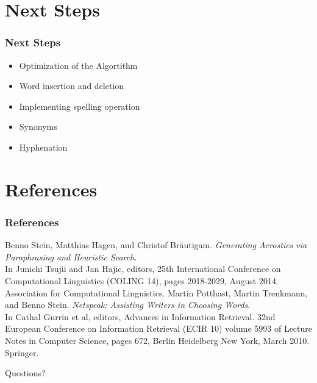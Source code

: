 \documentclass{beamer}
\begin{document}
\section{Next Steps}

\begin{frame}
\frametitle{Next Steps}
\begin{itemize}
\item Optimization of the Algortithm
\item Word insertion and deletion
\item Implementing spelling operation
\item Synonyms
\item Hyphenation 
\end{itemize}
\end{frame}

\section{References}

\begin{frame}
\frametitle{References}
\footnotesize
\begin{thebibliography}{1}
	Benno Stein, Matthias Hagen, and Christof Bräutigam. \emph{Generating Acrostics via Paraphrasing and Heuristic Search}. \\
	In Junichi Tsujii and Jan Hajic, editors, 25th International Conference on Computational Linguistics (COLING 14), pages 2018-2029, August 2014. Association for Computational Linguistics. 
	Martin Potthast, Martin Trenkmann, and Benno Stein.
	\emph{Netspeak: Assisting Writers in Choosing Words}. \\
	In Cathal Gurrin et al, editors, Advances in Information Retrieval. 32nd European Conference on Information Retrieval (ECIR 10) volume 5993 of Lecture Notes in Computer Science, pages 672, Berlin Heidelberg New York, March 2010. Springer.
\end{thebibliography}
\end{frame}

\begin{frame}
\Huge{\centerline{Questions?}}
\end{frame}

\end{document}
